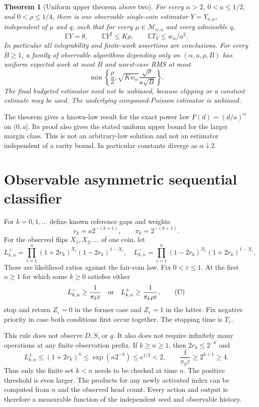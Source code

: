 \documentclass[11pt]{article}
\newtheorem{theorem}{Theorem}
\newcommand{\E}{\mathbb E}
\begin{document}
\begin{theorem}[Uniform upper theorem above two]\label{thm:upper}
For every $\alpha>2$, $0<a\le1/2$, and $0<\rho\le1/4$, there is one observable
single-coin estimator $Y=Y_{a,\rho}$, independent of $\mu$ and $q$, such that
for every $\mu\in\mathcal M_{\alpha,a}$ and every admissible $q$,
\[
 \E Y=\theta,\qquad \E Y^2\le K\rho,\qquad
 \E T_Y\le w_\alpha/a^2.
\]
In particular all integrability and finite-work assertions are conclusions.
For every $B\ge1$, a family of observable algorithms depending only on
$(\alpha,a,\rho,B)$ has uniform expected work at most $B$ and worst-case RMS
at most
\[
 \min\left\{\frac\rho2,
       \sqrt{K w_\alpha}\frac{\sqrt\rho}{a\sqrt B}\right\}.
\]
The final budgeted estimator need not be unbiased, because clipping or a constant
estimate may be used. The underlying compound-Poisson estimator is unbiased.
\end{theorem}

The theorem gives a known-law result for the exact power law
$F(d)=(d/a)^\alpha$ on $(0,a]$. Its proof also gives the stated uniform upper
bound for the larger margin class. This is not an arbitrary-law solution and
not an estimator independent of a rarity bound. In particular constants diverge
as $\alpha\downarrow2$.

\section{Observable asymmetric sequential classifier}
For $k=0,1,\ldots$ define known reference gaps and weights
\[
 r_k=a2^{-(k+1)},\qquad \pi_k=2^{-(k+1)}.
\]
For the observed flips $X_1,X_2,\ldots$ of one coin, let
\[
 L^+_{k,n}=\prod_{i=1}^n(1+2r_k)^{X_i}(1-2r_k)^{1-X_i},\quad
 L^-_{k,n}=\prod_{i=1}^n(1-2r_k)^{X_i}(1+2r_k)^{1-X_i}.
\]
These are likelihood ratios against the fair-coin law. Fix $0<\varepsilon\le1$.
At the first $n\ge1$ for which some $k\ge0$ satisfies either
\[
 L^-_{k,n}\ge\frac1{\pi_k\varepsilon}
 \quad\hbox{or}\quad
 L^+_{k,n}\ge\frac1{\pi_k\rho\varepsilon},                 \tag{C}
\]
stop and return $Z_\varepsilon=0$ in the former case and $Z_\varepsilon=1$ in
the latter. Fix negative priority in case both conditions first occur together.
The stopping time is $T_\varepsilon$.

This rule does not observe $D,S$, or $q$. It also does not require infinitely
many operations at any finite observation prefix. If $k\ge n\ge1$, then
$2r_k\le2^{-k}$ and
\[
 L^{\pm}_{k,n}\le(1+2r_k)^n\le\exp(n2^{-k})\le e^{1/2}<2,
 \qquad \frac1{\pi_k\varepsilon}\ge2^{k+1}\ge4.
\]
Thus only the finite set $k<n$ needs to be checked at time $n$. The positive
threshold is even larger. The products for any newly activated index can be
computed from $n$ and the observed head count. Every action and output is
therefore a measurable function of the independent seed and observable history.
\end{document}
